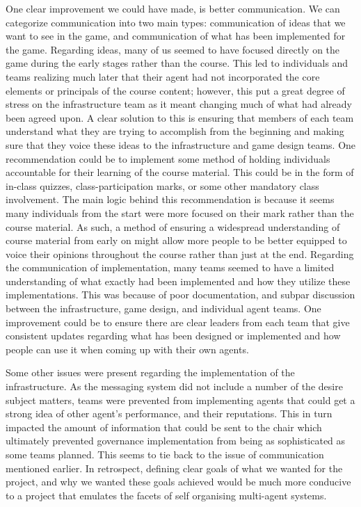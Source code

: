 One clear improvement we could have made, is better communication. We can categorize communication into two main types: communication of ideas that we want to see in the game, and communication of what has been implemented for the game. Regarding ideas, many of us seemed to have focused directly on the game during the early stages rather than the course. This led to individuals and teams realizing much later that their agent had not incorporated the core elements or principals of the course content; however, this put a great degree of stress on the infrastructure team as it meant changing much of what had already been agreed upon. A clear solution to this is ensuring that members of each team understand what they are trying to accomplish from the beginning and making sure that they voice these ideas to the infrastructure and game design teams. One recommendation could be to implement some method of holding individuals accountable for their learning of the course material. This could be in the form of in-class quizzes, class-participation marks, or some other mandatory class involvement. The main logic behind this recommendation is because it seems many individuals from the start were more focused on their mark rather than the course material. As such, a method of ensuring a widespread understanding of course material from early on might allow more people to be better equipped to voice their opinions throughout the course rather than just at the end. Regarding the communication of implementation, many teams seemed to have a limited understanding of what exactly had been implemented and how they utilize these implementations. This was because of poor documentation, and subpar discussion between the infrastructure, game design, and individual agent teams. One improvement could be to ensure there are clear leaders from each team that give consistent updates regarding what has been designed or implemented and how people can use it when coming up with their own agents.  

Some other issues were present regarding the implementation of the infrastructure. As the messaging system did not include a number of the desire subject matters, teams were prevented from implementing agents that could get a strong idea of other agent's performance, and their reputations. This in turn impacted the amount of information that could be sent to the chair which ultimately prevented governance implementation from being as sophisticated as some teams planned. This seems to tie back to the issue of communication mentioned earlier. In retrospect, defining clear goals of what we wanted for the project, and why we wanted these goals achieved would be much more conducive to a project that emulates the facets of self organising multi-agent systems.